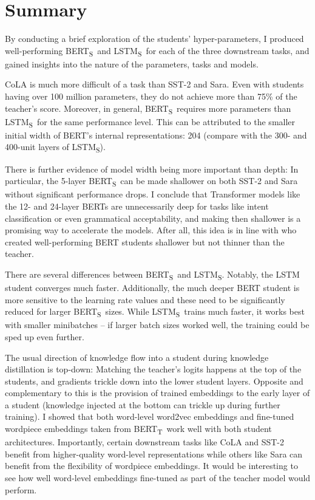 \documentclass[bsc,frontabs,twoside,singlespacing,parskip,deptreport]{infthesis}
\def\BERTT{BERT\textsubscript{T}}
\def\BERTS{BERT\textsubscript{S}}
\def\LSTMS{LSTM\textsubscript{S}}
\begin{document}
{  \section{Summary}{
    By conducting a brief exploration of the students' hyper-parameters, I produced well-performing \BERTS~and \LSTMS~for each of the three downstream tasks, and gained insights into the nature of the parameters, tasks and models.

    CoLA is much more difficult of a task than SST-2 and Sara. Even with students having over 100 million parameters, they do not achieve more than 75\% of the teacher's score. Moreover, in general, \BERTS~requires more parameters than \LSTMS~for the same performance level. This can be attributed to the smaller initial width of BERT's internal representations: 204 (compare with the 300- and 400-unit layers of \LSTMS).

    There is further evidence of model width being more important than depth: In particular, the 5-layer \BERTS~can be made shallower on both SST-2 and Sara without significant performance drops. I conclude that Transformer models like the 12- and 24-layer BERTs are unnecessarily deep for tasks like intent classification or even grammatical acceptability, and making then shallower is a promising way to accelerate the models. After all, this idea is in line with \citet{Sanh_2019} who created well-performing BERT students shallower but not thinner than the teacher.

    There are several differences between \BERTS~and \LSTMS. Notably, the LSTM student converges much faster. Additionally, the much deeper BERT student is more sensitive to the learning rate values and these need to be significantly reduced for larger \BERTS~sizes. While \LSTMS~trains much faster, it works best with smaller minibatches -- if larger batch sizes worked well, the training could be sped up even further.

    The usual direction of knowledge flow into a student during knowledge distillation is top-down: Matching the teacher's logits happens at the top of the students, and gradients trickle down into the lower student layers.
    Opposite and complementary to this is the provision of trained embeddings to the early layer of a student (knowledge injected at the bottom can trickle up during further training).
    I showed that both word-level word2vec embeddings and fine-tuned wordpiece embeddings taken from \BERTT~work well with both student architectures. Importantly, certain downstream tasks like CoLA and SST-2 benefit from higher-quality word-level representations while others like Sara can benefit from the flexibility of wordpiece embeddings. It would be interesting to see how well word-level embeddings fine-tuned as part of the teacher model would perform.

}}
\end{document}
